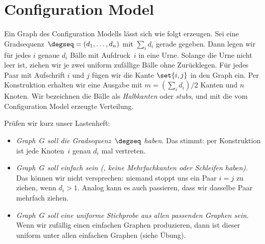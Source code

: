 \section{Configuration Model}
Ein Graph des Configuration Modells lässt sich wie folgt erzeugen.
Sei eine Gradsequenz~$\degseq = (d_1, \ldots, d_n)$ mit $\sum_i d_i$ gerade gegeben.
Dann legen wir für jedes $i$ genaue $d_i$ Bälle mit Aufdruck~$i$ in eine Urne.
Solange die Urne nicht leer ist, ziehen wir je zwei uniform zufällige Bälle ohne Zurücklegen.
Für jedes Paar mit Aufschrift $i$ und $j$ fügen wir die Kante $\set{i, j}$ in den Graph ein.
Per Konstruktion erhalten wir eine Ausgabe mit $m = (\sum_i d_i) / 2$ Kanten und $n$ Knoten.
Wir bezeichnen die Bälle als \emph{Halbkanten} oder \emph{stubs}, und mit \CMd die vom Configuration Model erzeugte Verteilung.

\medskip

\noindent
Prüfen wir kurz unser Lastenheft:
\begin{itemize}
    \item \emph{Graph~$G$ soll die Gradsequenz~$\degseq$ haben}.
          Das stimmt: per Konstruktion ist jede Knoten~$i$ genau $d_i$ mal vertreten.

    \item \emph{Graph~$G$ soll einfach sein (\dh, keine Mehrfachkanten oder Schleifen haben).}
          Das können wir nicht versprechen: niemand stoppt uns ein Paar $i = j$ zu ziehen, wenn $d_i > 1$.
          Analog kann es auch passieren, dass wir dasselbe Paar mehrfach ziehen.

    \item \emph{Graph~$G$ soll eine uniforme Stichprobe aus allen passenden Graphen sein.}
          Wenn wir zufällig einen einfachen Graphen produzieren, dann ist dieser uniform unter allen einfachen Graphen (siehe Übung).
\end{itemize}



